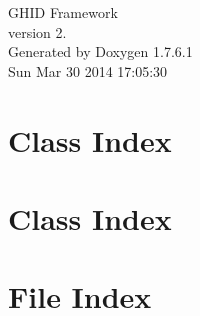 \documentclass[a4paper]{book}
\begin{document}
\hypersetup{pageanchor=false,citecolor=blue}
\begin{titlepage}
\vspace*{7cm}
\begin{center}
{\Large \-G\-H\-I\-D \-Framework \\[1ex]\large version 2. }\\
\vspace*{1cm}
{\large \-Generated by Doxygen 1.7.6.1}\\
\vspace*{0.5cm}
{\small Sun Mar 30 2014 17:05:30}\\
\end{center}
\end{titlepage}
\clearemptydoublepage
{}
\tableofcontents
\clearemptydoublepage
{}
\hypersetup{pageanchor=true,citecolor=blue}
\chapter{\-Class \-Index}

\chapter{\-Class \-Index}

\chapter{\-File \-Index}

\end{document}
